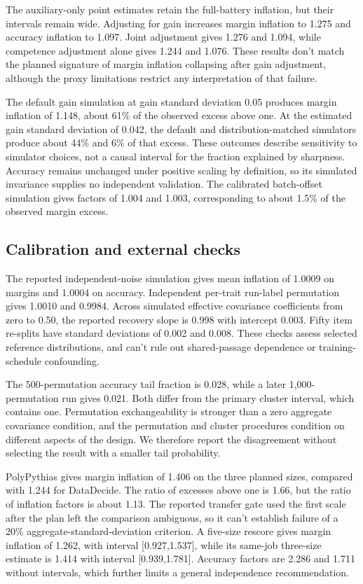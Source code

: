 \documentclass{article}
\begin{document}
The auxiliary-only point estimates retain the full-battery inflation, but their intervals remain wide. Adjusting for gain increases margin inflation to 1.275 and accuracy inflation to 1.097. Joint adjustment gives 1.276 and 1.094, while competence adjustment alone gives 1.244 and 1.076. These results don't match the planned signature of margin inflation collapsing after gain adjustment, although the proxy limitations restrict any interpretation of that failure.

The default gain simulation at gain standard deviation 0.05 produces margin inflation of 1.148, about 61\% of the observed excess above one. At the estimated gain standard deviation of 0.042, the default and distribution-matched simulators produce about 44\% and 6\% of that excess. These outcomes describe sensitivity to simulator choices, not a causal interval for the fraction explained by sharpness. Accuracy remains unchanged under positive scaling by definition, so its simulated invariance supplies no independent validation. The calibrated batch-offset simulation gives factors of 1.004 and 1.003, corresponding to about 1.5\% of the observed margin excess.

\subsection{Calibration and external checks}
The reported independent-noise simulation gives mean inflation of 1.0009 on margins and 1.0004 on accuracy. Independent per-trait run-label permutation gives 1.0010 and 0.9984. Across simulated effective covariance coefficients from zero to 0.50, the reported recovery slope is 0.998 with intercept 0.003. Fifty item re-splits have standard deviations of 0.002 and 0.008. These checks assess selected reference distributions, and can't rule out shared-passage dependence or training-schedule confounding.

The 500-permutation accuracy tail fraction is 0.028, while a later 1,000-permutation run gives 0.021. Both differ from the primary cluster interval, which contains one. Permutation exchangeability is stronger than a zero aggregate covariance condition, and the permutation and cluster procedures condition on different aspects of the design. We therefore report the disagreement without selecting the result with a smaller tail probability.

PolyPythias gives margin inflation of 1.406 on the three planned sizes, compared with 1.244 for DataDecide. The ratio of excesses above one is 1.66, but the ratio of inflation factors is about 1.13. The reported transfer gate used the first scale after the plan left the comparison ambiguous, so it can't establish failure of a 20\% aggregate-standard-deviation criterion. A five-size rescore gives margin inflation of 1.262, with interval [0.927,1.537], while its same-job three-size estimate is 1.414 with interval [0.939,1.781]. Accuracy factors are 2.286 and 1.711 without intervals, which further limits a general independence recommendation.
\end{document}
